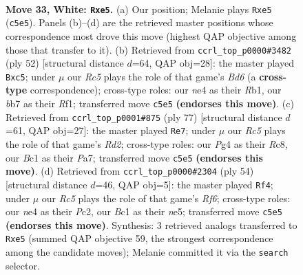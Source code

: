 \documentclass[11pt]{article}
\begin{document}
\clearpage

\begin{figure}[p]\centering
\begin{subfigure}{0.46\textwidth}\centering
\resizebox{\linewidth}{!}{%
\newchessgame
\chessboard[
  setfen={1r1r4/pb1p1pk1/8/2R1p3/4n1P1/8/PP3P2/2BK1BR1 w - - 3 33},
  showmover=false,
  pgfstyle=straightmove, color=movearrow, markmove={c5-e5}
]}
\caption{}
\end{subfigure}\hfill
\begin{subfigure}{0.46\textwidth}\centering
\resizebox{\linewidth}{!}{%
\newchessgame
\chessboard[
  setfen={r2r2k1/1p3pb1/3B3p/p1p2B2/Pn6/7P/2P3P1/1R3R1K w - - 3 27},
  showmover=false,
  pgfstyle=straightmove, color=movearrow, markmove={d6-c5}
]}
\caption{}
\end{subfigure}
\\[4pt]
\begin{subfigure}{0.46\textwidth}\centering
\resizebox{\linewidth}{!}{%
\newchessgame
\chessboard[
  setfen={2r3k1/p2r2b1/4p3/1RN2p2/2P5/3P4/4KP2/1R6 b - - 11 39},
  showmover=false,
  pgfstyle=straightmove, color=movearrow, markmove={d7-e7}
]}
\caption{}
\end{subfigure}\hfill
\begin{subfigure}{0.46\textwidth}\centering
\resizebox{\linewidth}{!}{%
\newchessgame
\chessboard[
  setfen={6rr/1p2k3/p3pR1p/4n3/8/2P5/P1P3PP/2K2B1R w - - 0 28},
  showmover=false,
  pgfstyle=straightmove, color=movearrow, markmove={f6-f4}
]}
\caption{}
\end{subfigure}
\caption{\textbf{Move 33, White: \texttt{Rxe5}.} (a) Our position; Melanie plays \texttt{Rxe5} (\texttt{c5e5}). Panels (b)--(d) are the retrieved master positions whose correspondence most drove this move (highest QAP objective among those that transfer to it). (b) Retrieved from \texttt{ccrl\_top\_p0000\#3482} (ply 52) [structural distance $d$=64, QAP obj=28]: the master played \texttt{Bxc5}; under $\mu$ our \emph{Rc5} plays the role of that game's \emph{Bd6} (a \textbf{cross-type} correspondence); cross-type roles: our \emph{n}e4 as their \emph{R}b1, our \emph{b}b7 as their \emph{R}f1; transferred move \texttt{c5e5} \textbf{(endorses this move)}. (c) Retrieved from \texttt{ccrl\_top\_p0001\#875} (ply 77) [structural distance $d$=61, QAP obj=27]: the master played \texttt{Re7}; under $\mu$ our \emph{Rc5} plays the role of that game's \emph{Rd2}; cross-type roles: our \emph{P}g4 as their \emph{R}c8, our \emph{B}c1 as their \emph{P}a7; transferred move \texttt{c5e5} \textbf{(endorses this move)}. (d) Retrieved from \texttt{ccrl\_top\_p0000\#2304} (ply 54) [structural distance $d$=46, QAP obj=5]: the master played \texttt{Rf4}; under $\mu$ our \emph{Rc5} plays the role of that game's \emph{Rf6}; cross-type roles: our \emph{n}e4 as their \emph{P}c2, our \emph{B}c1 as their \emph{n}e5; transferred move \texttt{c5e5} \textbf{(endorses this move)}. Synthesis: 3 retrieved analogs transferred to \texttt{Rxe5} (summed QAP objective 59, the strongest correspondence among the candidate moves); Melanie committed it via the \texttt{search} selector.}
\label{fig:thought-m64}
\end{figure}
\end{document}
